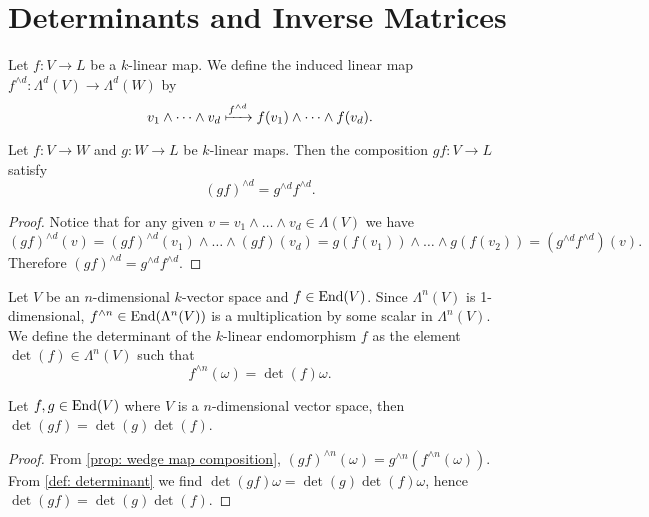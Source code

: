 \section{Determinants and Inverse Matrices}

\begin{definition}\label{def: wedge map}
  Let \(f: V \to L\) be a \(k\)-linear map. We define the induced linear map
  \(f^{\wedge d}: \Lambda^d(V) \to \Lambda^d(W)\) by
  \[
    v_1 \wedge \dots \wedge v_d \xmapsto{f^{\wedge d}}
    f(v_1) \wedge \dots \wedge f(v_d).
  \] 
\end{definition}

\begin{proposition}\label{prop: wedge map composition}
  Let \(f: V \to W\) and \(g: W \to L\) be \(k\)-linear maps. Then the
  composition \(g f: V \to L\) satisfy
  \[
    (g f)^{\wedge d} = g^{\wedge d} f^{\wedge d}.
  \]
\end{proposition}

\begin{proof}
  Notice that for any given \(v = v_1 \wedge \dots \wedge v_d \in \Lambda(V)\)
  we have
  \[
    (g f)^{\wedge d}(v) = (g f)^{\wedge d}(v_1) \wedge \dots \wedge (g f)(v_d)
    = g(f(v_1)) \wedge \dots \wedge g(f(v_2))
    = (g^{\wedge d} f^{\wedge d})(v).
  \] 
  Therefore \((g f)^{\wedge d} = g^{\wedge d} f^{\wedge d}\).
\end{proof}

\begin{definition}[Determinant]\label{def: determinant}
  Let \(V\) be an \(n\)-dimensional \(k\)-vector space and \(f \in \operatorname{End}(V)\).
  Since \(\Lambda^n(V)\) is 1-dimensional, \(f^{\wedge n} \in \operatorname{End}(\Lambda^n
  (V))\) is a multiplication by some scalar in \(\Lambda^n(V)\).  We define the
  determinant of the \(k\)-linear endomorphism \(f\) as the element \(\det(f)
  \in \Lambda^n(V)\) such that
  \[
    f^{\wedge n}(\omega) = \det(f) \omega.
  \] 
\end{definition}

\begin{proposition}\label{prop: comp det}
  Let \(f, g \in \operatorname{End}(V)\) where \(V\) is a \(n\)-dimensional vector space, then
  \(\det(g f) = \det(g) \det(f)\).
\end{proposition}

\begin{proof}
  From \cref{prop: wedge map composition}, \((g f)^{\wedge n}(\omega) =
  g^{\wedge n}(f^{\wedge n}(\omega))\). From \cref{def: determinant} we find
  \(\det(g f) \omega = \det(g) \det(f) \omega\), hence \(\det(g f) = \det(g)
  \det(f)\).
\end{proof}

